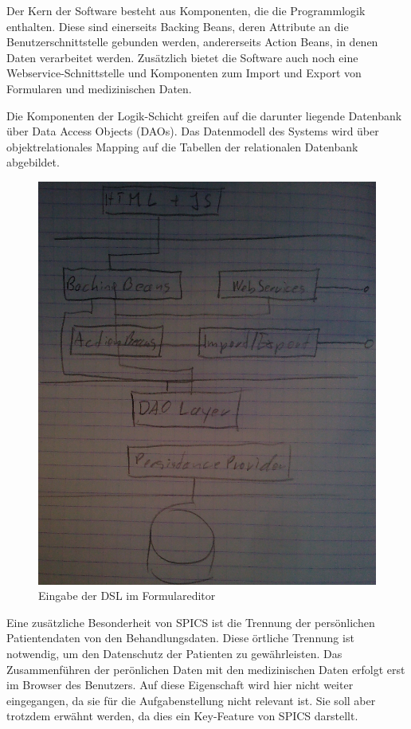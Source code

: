 Der Kern der Software besteht aus Komponenten, die die Programmlogik enthalten. Diese sind einerseits Backing Beans, deren Attribute an die Benutzerschnittstelle gebunden werden, andererseits Action Beans, in denen Daten verarbeitet werden. Zu\-sätz\-lich bietet die Software auch noch eine Webservice-Schnittstelle und Komponenten zum Import und Export von Formularen und medizinischen Daten.

Die Komponenten der Logik-Schicht greifen auf die darunter liegende Datenbank über Data Access Objects (DAOs). Das Datenmodell des Systems wird über objektrelationales Mapping auf die Tabellen der relationalen Datenbank abgebildet.

\begin{figure}[h]
\begin{center}
\includegraphics[scale=0.3]{figures/spics_architektur}
\caption{Eingabe der DSL im Formulareditor}

\label{abb_spics_architektur}
\end{center}
\end{figure}

Eine zusätzliche Besonderheit von SPICS ist die Trennung der persönlichen Patientendaten von den Behandlungsdaten. Diese örtliche Trennung ist not\-wen\-dig, um den Datenschutz der Patienten zu gewährleisten. Das Zusammenführen der perönlichen Daten mit den medizinischen Daten erfolgt erst im Browser des Benutzers. Auf diese Eigenschaft wird hier nicht weiter eingegangen, da sie für die Aufgabenstellung nicht relevant ist. Sie soll aber trotzdem erwähnt werden, da dies ein Key-Feature von SPICS darstellt.

